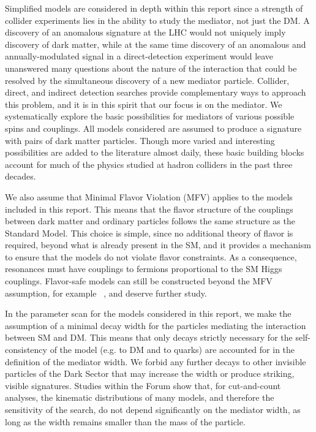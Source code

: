 Simplified models are considered in depth within this report since a strength of collider experiments lies in the ability to
study the mediator, not just the DM. A discovery of an
anomalous \MET signature
at the LHC would not uniquely imply discovery of dark matter, while at
the same time discovery of an anomalous and annually-modulated signal
in a direct-detection experiment would leave unanswered many questions
about the nature of the interaction that could be resolved by the simultaneous discovery
of a new mediator particle. 
Collider, direct, and indirect detection searches provide complementary ways to
approach this problem, and it is in this spirit that our focus is on
the mediator. We systematically explore the basic possibilities for
mediators of various possible spins and couplings.
All models considered are assumed to produce a signature with pairs of dark matter particles.
Though more varied and
interesting possibilities are added to the literature almost daily,
these basic building blocks account for much of the physics studied at
hadron colliders in the past three decades.

We also assume that Minimal Flavor Violation (MFV) \cite{Chivukula:1987py,Hall:1990ac,Buras:2000dm,D'Ambrosio:2002ex} applies to the
models included in this report. This means that the flavor structure of the
couplings between dark matter and ordinary particles follows the same
structure as the Standard Model. This choice is simple, since no
additional theory of flavor is required, beyond what is already
present in the SM, and it provides a mechanism to ensure that the
models do not violate flavor constraints.  As a consequence, \spinzero
resonances must have couplings to fermions proportional to the SM Higgs couplings. 
Flavor-safe models can still be constructed beyond the MFV
assumption, for example ~\cite{Agrawal:2014aoa}, and deserve further study.

In the parameter scan for the models considered in this report, we make the
assumption of a minimal decay width for the particles mediating the
interaction between SM and DM.  This means that only decays
strictly necessary for the self-consistency of the model (e.g.  to DM
and to quarks) are accounted for in the definition of the mediator
width. We forbid any further decays to other invisible particles of
the Dark Sector that may increase the width or produce striking, visible signatures. 
Studies within the Forum
show that, for cut-and-count analyses, the kinematic distributions of
many models, and therefore the sensitivity of the search, do not depend
significantly on the mediator width, as long as the width remains smaller
than the mass of the particle.

